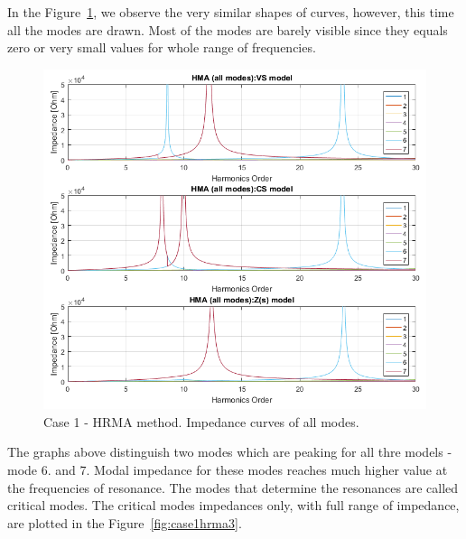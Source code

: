 \documentclass[12pt]{report} %
\begin{document}
In the Figure~\ref{fig:case1hrma2}, we observe the very similar shapes of curves, however, this time all the modes are drawn. Most of the modes are barely visible since they equals zero or very small values for whole range of frequencies. 

\begin{figure}[htb]
	\centering
	\includegraphics[width=1\textwidth]{img/Case1/Case1_HMA_all.png}
  	\caption{Case 1 - HRMA method. Impedance curves of all modes.}
  	\label{fig:case1hrma2}
\end{figure}
\FloatBarrier

The graphs above distinguish two modes which are peaking for all thre models - mode 6. and 7. Modal impedance for these modes reaches much higher value at the frequencies of resonance. The modes that determine the resonances are called critical modes. The critical modes impedances only, with full range of impedance, are plotted in the Figure~\ref{fig:case1hrma3}.
\end{document}
